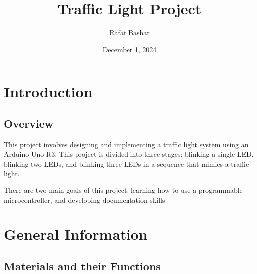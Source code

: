\documentclass[12pt]{article}
\title{Traffic Light Project}
\author{Rafat Bashar}
\date{December 1, 2024}
\begin{document}
\maketitle

\section{Introduction}

\subsection{Overview}

This project involves designing and implementing a traffic light system using an Arduino Uno R3. This project is divided into three stages: blinking a single LED, blinking
two LEDs, and blinking three LEDs in a sequence that mimics a traffic light. 

There are two main goals of this project: learning how to use a programmable microcontroller, and developing documentation skills

\section{General Information}

\subsection{Materials and their Functions}
\end{document}
